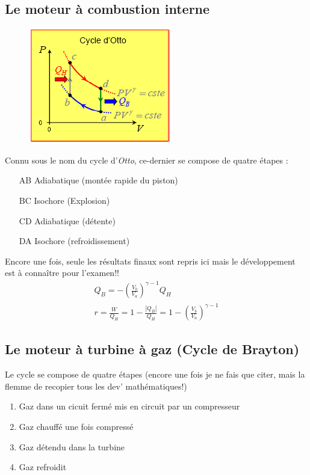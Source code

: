 \documentclass	[11pt, a4paper, openany]{book}
\begin{document}
\subsection{Le moteur à combustion interne}
\begin{figure}
\includegraphics[scale=0.54]{th/image18.png}
\end{figure}
Connu sous le nom du cycle d'\textit{Otto}, ce-dernier se compose de quatre étapes :
\begin{itemize}
\item[AB] Adiabatique (montée rapide du piston)
\item[BC] Isochore (Explosion)
\item[CD] Adiabatique (détente)
\item[DA] Isochore (refroidissement)
\end{itemize}
Encore une fois, seule les résultats finaux sont repris ici mais le développement est à connaître pour l'examen!!
\begin{eqnarray}
Q_B = -\left(\frac{V_b}{V_a}\right)^{\gamma -1}Q_H\\
r = \frac{W}{Q_H} = 1 - \frac{|Q_B|}{Q_H} = 1 - \left(\frac{V_b}{V_a}\right)^{\gamma -1}
\end{eqnarray}


\subsection{Le moteur à turbine à gaz (Cycle de Brayton)}
Le cycle se compose de quatre étapes (encore une fois je ne fais que citer, mais la flemme de recopier tous les dev' mathématiques!)
\begin{enumerate}
\item Gaz dans un cicuit fermé mis en circuit par un compresseur 
\item Gaz chauffé une fois compressé
\item Gaz détendu dans la turbine
\item Gaz refroidit
\end{enumerate}
\end{document}
